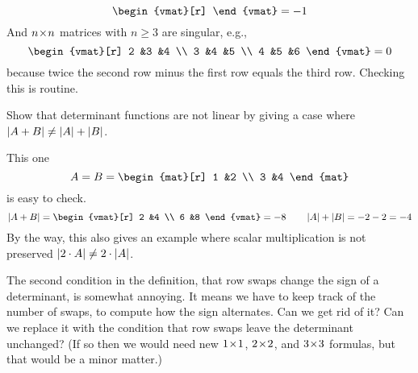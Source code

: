 \begin{exercises}
\begin{answer}
\begin{exparts}
\begin{equation*}
\begin{vmat}[r]
            \end{vmat}=-1
          \end{equation*}
          And $n \! \times \! n$ matrices with $n\geq 3$ are singular, e.g.,
          \begin{equation*}
            \begin{vmat}[r]
              2  &3  &4  \\
              3  &4  &5  \\
              4  &5  &6
            \end{vmat}=0
          \end{equation*}
          because twice the second row minus the first row 
          equals the third row.
          Checking this is routine.
      \end{exparts} 
    \end{answer}
  \recommended \item 
    Show that determinant functions are not linear by  
    giving a case where \( \deter{A+B}\neq\deter{A}+\deter{B} \).
    \begin{answer}
      This one 
      \begin{equation*}
         A=B=
         \begin{mat}[r]
           1  &2  \\
           3  &4
         \end{mat}
      \end{equation*}
      is easy to check.
      \begin{equation*}
         \deter{A+B}
         =
         \begin{vmat}[r]
           2  &4  \\
           6  &8
         \end{vmat}
         =-8
         \qquad
         \deter{A}+\deter{B}
         =
         -2-2
         =-4
      \end{equation*}
      By the way, this also gives an example where scalar multiplication 
      is not preserved 
      $\deter{2\cdot A}\neq 2\cdot\deter{A}$.  
     \end{answer}
  \item 
    The second condition in the definition, that row swaps change the 
    sign of a determinant, is somewhat annoying.
    It means we have to keep track of the number of swaps, to compute how
    the sign alternates.
    Can we get rid of it?
    Can we replace it with the condition that row swaps leave the determinant
    unchanged?
    (If so then we would need new $1 \! \times \! 1$,
     $2 \! \times \! 2$, and $3 \! \times \! 3$ formulas, but that would be a minor matter.)

\end{exercises}
